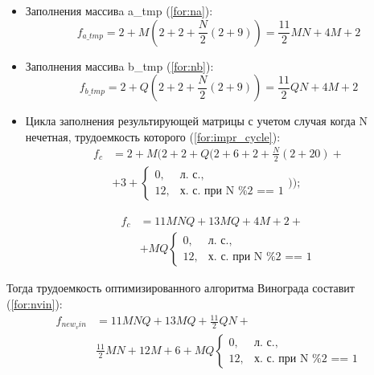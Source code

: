 \begin{itemize}
	\item Заполнения массивa a\_tmp (\ref{for:na}):
	\begin{equation}
		\label{for:na}
		f_{a\_tmp} =  2 + M(2 + 2 + \frac{N}{2}(2 + 9)) = \frac{11}{2}MN + 4M + 2
	\end{equation}
	
	\item Заполнения массивa b\_tmp (\ref{for:nb}):
	\begin{equation}
		\label{for:nb}
		f_{b\_tmp} =  2 + Q(2 + 2 + \frac{N}{2}(2 + 9)) = \frac{11}{2}QN + 4M + 2
	\end{equation}
	
	\item Цикла заполнения результирующей матрицы с учетом случая когда N нечетная, трудоемкость которого (\ref{for:impr_cycle}):
	\begin{equation}
	\begin{aligned}
		\label{for:impr_cycle0}
		f_{c} &= 2 + M (2 + 2 + Q(2 + 6 + 2 + \frac{N}{2}(2 + 20) + \\
		& + 3 + 
		\begin{cases}
			0, & \text{л. с.,}\\
			12, & \text{х. с. при N \% 2 == 1}
		\end{cases}
		));
	\end{aligned}
	\end{equation}
	
	\begin{equation}
	\begin{aligned}
		\label{for:impr_cycle}
		f_{c} &= 11MNQ + 13MQ + 4M + 2 + \\
		&+ MQ
		\begin{cases}
			0, & \text{л. с.,}\\
			12, & \text{х. с. при N \% 2 == 1}
		\end{cases}
	\end{aligned}
	\end{equation}
\end{itemize}


Тогда трудоемкость оптимизированного алгоритма Винограда составит (\ref{for:nvin}):
\begin{equation}
\begin{aligned}
	\label{for:nvin}
	f_{new_vin} &=  11MNQ + 13MQ + \frac{11}{2}QN + \\
	&\frac{11}{2}MN + 12M + 6 + MQ
	\begin{cases}
		0, & \text{л. с.,}\\
		12, & \text{х. с. при N \% 2 == 1}
	\end{cases}
\end{aligned}
\end{equation}

